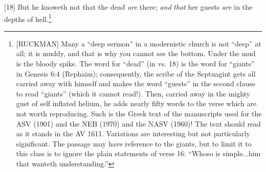 [18] \textcolor[rgb]{0.00,0.00,1.00}{But he knoweth not that the dead \emph{are} there; \emph{and} \emph{that} her guests \emph{are} in the depths of hell.}\footnote{[RUCKMAN] Many a ``deep sermon'' in a modernistic church is not ``deep'' at all; it is muddy, and that is why you cannot see the bottom. Under the mud is the bloody spike. The word for ``dead'' (in vs. 18) is the word for ``giants'' in Genesis 6:4 (Rephaim); consequently, the scribe of the Septuagint gets all carried away with himself and makes the word ``guests'' in the second clause to read ``giants'' (which it cannot read!). Then, carried away in the mighty gust of self inflated helium, he adds nearly fifty words to the verse which are not worth reproducing. Such is the Greek text of the manuscripts used for the ASV (1901) and the NEB (1970) and the NASV (1960)! The text should read as it stands in the AV 1611. Variations are interesting but not particularly significant. The passage may have reference to the giants, but to limit it to this class is to ignore the plain statements of verse 16: ``Whoso is simple...him that wanteth understanding.''\cite{Ruckman1972Proverbs}  }






